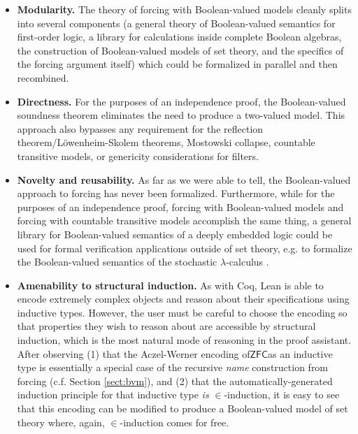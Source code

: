 \documentclass[a4paper,USenglish,cleveref, autoref]{lipics-v2019}
\theoremstyle{definition}
\begin{document}
\begin{itemize}
\item \textbf{Modularity.} The theory of forcing with Boolean-valued models cleanly splits into several components (a general theory of Boolean-valued semantics for first-order logic, a library for calculations inside complete Boolean algebras, the construction of Boolean-valued models of set theory, and the specifics of the forcing argument itself) which could be formalized in parallel and then recombined.

\item \textbf{Directness.} For the purposes of an independence proof, the Boolean-valued soundness theorem eliminates the need to produce a two-valued model. This approach also bypasses any requirement for the reflection theorem/L\"owenheim-Skolem theorems, Mostowski collapse, countable transitive models, or genericity considerations for filters.

\item \textbf{Novelty and reusability.} As far as we were able to tell, the Boolean-valued approach to forcing has never been formalized. Furthermore, while for the purposes of an independence proof, forcing with Boolean-valued models and forcing with countable transitive models accomplish the same thing, a general library for Boolean-valued semantics of a deeply embedded logic could be used for formal verification applications outside of set theory, e.g. to formalize the Boolean-valued semantics of the stochastic $\lambda$-calculus \cite{scott2}.

  \item \textbf{Amenability to structural induction.} As with Coq, Lean is able to encode extremely complex objects and reason about their specifications using inductive types. However, the user must be careful to choose the encoding so that properties they wish to reason about are accessible by structural induction, which is the most natural mode of reasoning in the proof assistant. After observing (1) that the Aczel-Werner encoding of$\mathsf{ZFC}$as an inductive type is essentially a special case of the recursive \emph{name} construction from forcing (c.f. Section \ref{sect:bvm}), and (2) that the automatically-generated induction principle for that inductive type \emph{is} $\in$-induction, it is easy to see that this encoding can be modified to produce a Boolean-valued model of set theory where, again, $\in$-induction comes for free.
\end{itemize}
\end{document}
